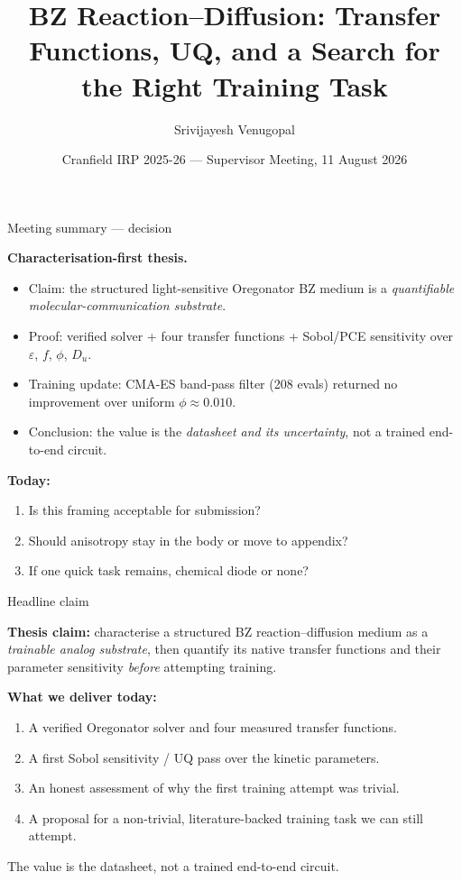 \documentclass[aspectratio=169,11pt]{beamer}
\title{BZ Reaction--Diffusion: Transfer Functions, UQ, and a Search for the Right Training Task}
\author{Srivijayesh Venugopal}
\date{Cranfield IRP 2025-26 --- Supervisor Meeting, 11 August 2026}
\begin{document}
\begin{frame}
\titlepage
\end{frame}

\begin{frame}{Meeting summary --- decision}

\textbf{Characterisation-first thesis.}

\begin{itemize}
    \item Claim: the structured light-sensitive Oregonator BZ medium is a \emph{quantifiable molecular-communication substrate}.
    \item Proof: verified solver + four transfer functions + Sobol/PCE sensitivity over $\varepsilon$, $f$, $\phi$, $D_u$.
    \item Training update: CMA-ES band-pass filter (208 evals) returned no improvement over uniform $\phi \approx 0.010$.
    \item Conclusion: the value is the \emph{datasheet and its uncertainty}, not a trained end-to-end circuit.
\end{itemize}

\vspace{0.3cm}
\textbf{Today:}
\begin{enumerate}
    \item Is this framing acceptable for submission?
    \item Should anisotropy stay in the body or move to appendix?
    \item If one quick task remains, chemical diode or none?
\end{enumerate}

\end{frame}

\begin{frame}{Headline claim}

\textbf{Thesis claim:} characterise a structured BZ reaction--diffusion medium as a \emph{trainable analog substrate}, then quantify its native transfer functions and their parameter sensitivity \emph{before} attempting training.

\vspace{0.4cm}
\textbf{What we deliver today:}
\begin{enumerate}
    \item A verified Oregonator solver and four measured transfer functions.
    \item A first Sobol sensitivity / UQ pass over the kinetic parameters.
    \item An honest assessment of why the first training attempt was trivial.
    \item A proposal for a non-trivial, literature-backed training task we can still attempt.
\end{enumerate}

\vspace{0.3cm}
{\small The value is the datasheet, not a trained end-to-end circuit.}

\end{frame}
\end{document}
